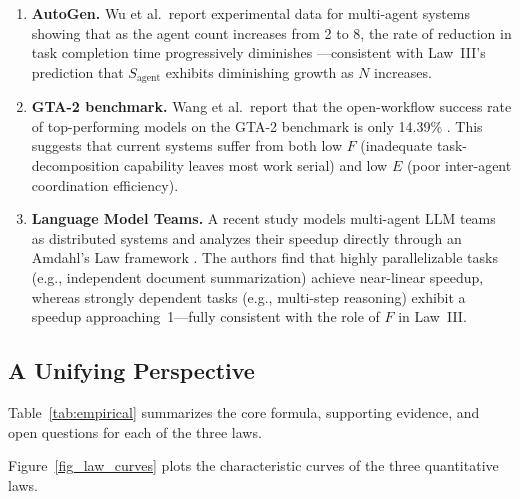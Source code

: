 \documentclass[11pt,a4paper]{article}
\begin{document}
\begin{enumerate}[nosep]
\item \textbf{AutoGen.} Wu et al.\ report experimental data for multi-agent systems showing that as the agent count increases from 2 to 8, the rate of reduction in task completion time progressively diminishes \cite{wu2023autogen}---consistent with Law~III's prediction that $S_{\mathrm{agent}}$ exhibits diminishing growth as $N$ increases.

\item \textbf{GTA-2 benchmark.} Wang et al.\ report that the open-workflow success rate of top-performing models on the GTA-2 benchmark is only 14.39\% \cite{gta2_2025}. This suggests that current systems suffer from both low $F$ (inadequate task-decomposition capability leaves most work serial) and low $E$ (poor inter-agent coordination efficiency).

\item \textbf{Language Model Teams.} A recent study models multi-agent LLM teams as distributed systems and analyzes their speedup directly through an Amdahl's Law framework \cite{langmodelteams2026}. The authors find that highly parallelizable tasks (e.g., independent document summarization) achieve near-linear speedup, whereas strongly dependent tasks (e.g., multi-step reasoning) exhibit a speedup approaching~1---fully consistent with the role of $F$ in Law~III.
\end{enumerate}

\subsection{A Unifying Perspective}
\label{sec:laws-summary}

Table~\ref{tab:empirical} summarizes the core formula, supporting evidence, and open questions for each of the three laws.

Figure~\ref{fig_law_curves} plots the characteristic curves of the three quantitative laws.

\end{document}
